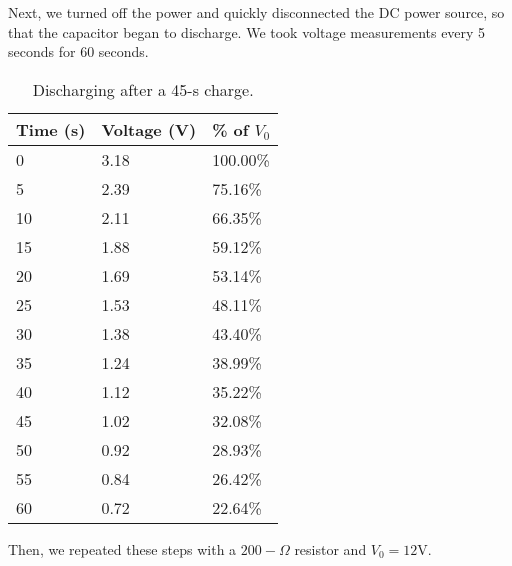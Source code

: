 \documentclass[11pt, titlepage, letterpaper, twoside]{article}
\begin{document}
\pagebreak



Next, we turned off the power and quickly disconnected the DC power source, so that the
capacitor began to discharge. We took voltage measurements every 5 seconds for 60 seconds.

\begin{table}[h!]
\centering
\caption{Discharging after a 45-s charge.}
\label{discharging-1}
\begin{tabular}{|l|l|l|}
\hline
Time (s) & Voltage (V) & \% of $V_0$ \\ \hline
0        & 3.18        & 100.00\%   \\ \hline
5        & 2.39        & 75.16\%    \\ \hline
10       & 2.11        & 66.35\%    \\ \hline
15       & 1.88        & 59.12\%    \\ \hline
20       & 1.69        & 53.14\%    \\ \hline
25       & 1.53        & 48.11\%    \\ \hline
30       & 1.38        & 43.40\%    \\ \hline
35       & 1.24        & 38.99\%    \\ \hline
40       & 1.12        & 35.22\%    \\ \hline
45       & 1.02        & 32.08\%    \\ \hline
50       & 0.92        & 28.93\%    \\ \hline
55       & 0.84        & 26.42\%    \\ \hline
60       & 0.72        & 22.64\%    \\ \hline
\end{tabular}
\end{table}



Then, we repeated these steps with a $200-\Omega$ resistor and $V_0 = 12 \mathrm{V}$.
\end{document}
